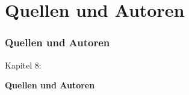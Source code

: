 %

\section{Quellen und Autoren}
\begin{frame}[fragile]
	\frametitle{Quellen und Autoren}

	\begin{center}\huge{Kapitel 8:}\end{center}
	\begin{center}\huge{\color{typo3darkgrey}\textbf{Quellen und Autoren}}\end{center}

\end{frame}

